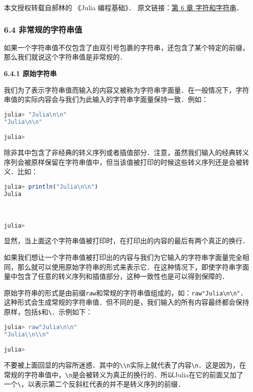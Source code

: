 
本文授权转载自郝林的 《Julia 编程基础》． 原文链接：\href{https://github.com/hyper0x/JuliaBasics/blob/master/book/ch06.md}{第 6 章 字符和字符串}．


\subsubsection{6.4 非常规的字符串值}

如果一个字符串值不仅包含了由双引号包裹的字符串，还包含了某个特定的前缀，那么我们就说这个字符串值是非常规的．

\textbf{6.4.1 原始字符串}

我们为了表示字符串值而输入的内容又被称为字符串字面量．在一般情况下，字符串值的实际内容会与我们为此输入的字符串字面量保持一致．例如：
\begin{lstlisting}[language=julia]
julia> "Julia\n\n"
"Julia\n\n"

julia> 
\end{lstlisting}

除非其中包含了非经典的转义序列或者插值部分．注意，虽然我们输入的经典转义序列会被原样保留在字符串值中，但当该值被打印的时候这些转义序列还是会被转义．比如：
\begin{lstlisting}[language=julia]
julia> println("Julia\n\n")
Julia



julia> 
\end{lstlisting}

显然，当上面这个字符串值被打印时，在打印出的内容的最后有两个真正的换行．

如果我们想让一个字符串值被打印出的内容与我们为它输入的字符串字面量完全相同，那么就可以使用原始字符串的形式来表示它．在这种情况下，即使字符串字面量中包含了任意的转义序列和插值部分，这种一致性也是可以得到保障的．

原始字符串的形式是由前缀\verb|raw|和常规的字符串值组成的，如：\verb|raw"Julia\n\n"|．这种形式会生成常规的字符串值．但不同的是，我们输入的所有内容最终都会保持原样，包括\verb|$|和\verb|\|．示例如下：
\begin{lstlisting}[language=julia]
julia> raw"Julia\n\n"
"Julia\\n\\n"

julia> 
\end{lstlisting}

不要被上面回显的内容所迷惑．其中的\verb|\\n|实际上就代表了内容\verb|\n|．这是因为，在常规的字符串值中，\verb|\n|是会被转义为真正的换行的．所以Julia在它的前面又加了一个\verb|\|，以表示第二个反斜杠代表的并不是转义序列的前缀．

